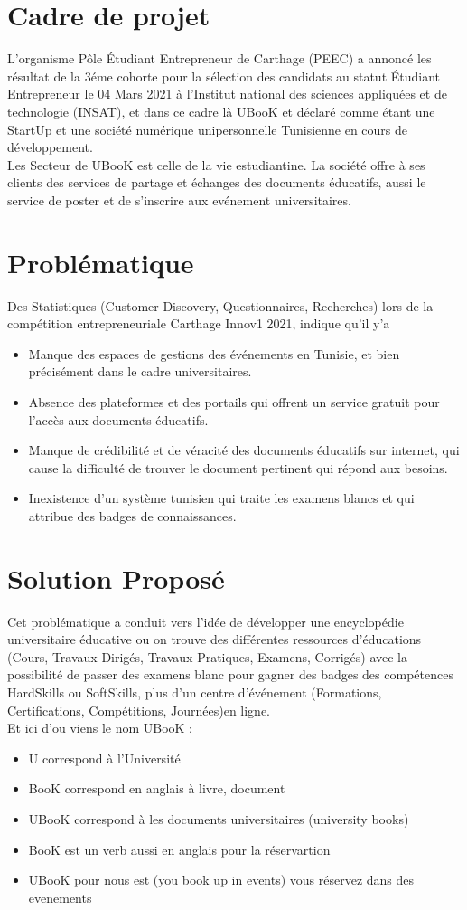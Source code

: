 \documentclass[12pt]{report}
\begin{document}
\section*{Cadre de projet}
L'organisme Pôle Étudiant Entrepreneur de Carthage (PEEC) a annoncé les résultat de la 3éme cohorte pour la sélection des candidats au statut Étudiant Entrepreneur le 04 Mars 2021 à l'Institut national des sciences appliquées et de technologie (INSAT), et dans ce cadre là UBooK et déclaré comme étant une StartUp et une société numérique unipersonnelle Tunisienne en cours de développement.
\\Les Secteur de UBooK est celle de la vie estudiantine. La société offre à ses clients des services de partage et échanges des documents éducatifs, aussi le service de poster et de s'inscrire aux evénement universitaires.
\section*{Problématique}
Des Statistiques (Customer Discovery, Questionnaires, Recherches) lors de la compétition entrepreneuriale Carthage Innov1 2021, indique qu'il y'a 
\begin{itemize}
\item 
Manque des espaces de gestions des événements en Tunisie, et bien précisément dans le cadre universitaires.
\item Absence des plateformes et des portails qui offrent un service gratuit pour l'accès aux documents éducatifs.
\item Manque de crédibilité et de véracité des documents éducatifs sur internet, qui cause la difficulté de trouver le document pertinent qui répond aux besoins. 
\item Inexistence d'un système tunisien qui traite les examens blancs et qui attribue des badges de connaissances.
\end{itemize}
\section*{Solution Proposé}
Cet problématique a conduit vers l'idée de développer une encyclopédie universitaire éducative ou on trouve des différentes ressources d'éducations (Cours, Travaux Dirigés, Travaux Pratiques, Examens, Corrigés) avec la possibilité de passer des examens blanc pour gagner des badges des compétences HardSkills ou SoftSkills, plus d'un centre d'événement (Formations, Certifications, Compétitions, Journées)en ligne.\\
Et ici d'ou viens le nom UBooK : 
\begin{itemize}
\item U correspond à l'Université
\item BooK correspond en anglais à livre, document
\item UBooK correspond à les documents universitaires (university books)
\item BooK est un verb aussi en anglais pour la réservartion
\item UBooK pour nous est (you book up in events) vous réservez dans des evenements
\end{itemize}
\newpage
\end{document}
